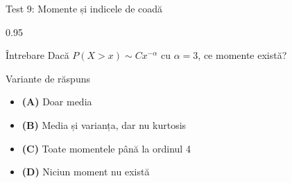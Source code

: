 \documentclass[9pt, aspectratio=169, t]{beamer}
\begin{document}
\begin{frame}{Test 9: Momente și indicele de coadă}
    \begin{cminipage}{0.95\textwidth}
    \begin{alertblock}{Întrebare}
        Dacă $P(X > x) \sim Cx^{-\alpha}$ cu $\alpha = 3$, ce momente există?
    \end{alertblock}
    \begin{block}{Variante de răspuns}
    \begin{itemize}\setlength{\itemsep}{0pt}
        \item \textcolor{MainBlue}{\textbf{(A)}} Doar media
        \item \textcolor{MainBlue}{\textbf{(B)}} Media și varianța, dar nu kurtosis
        \item \textcolor{MainBlue}{\textbf{(C)}} Toate momentele până la ordinul 4
        \item \textcolor{MainBlue}{\textbf{(D)}} Niciun moment nu există
    \end{itemize}
    \end{block}
    \end{cminipage}
\end{frame}
\end{document}
